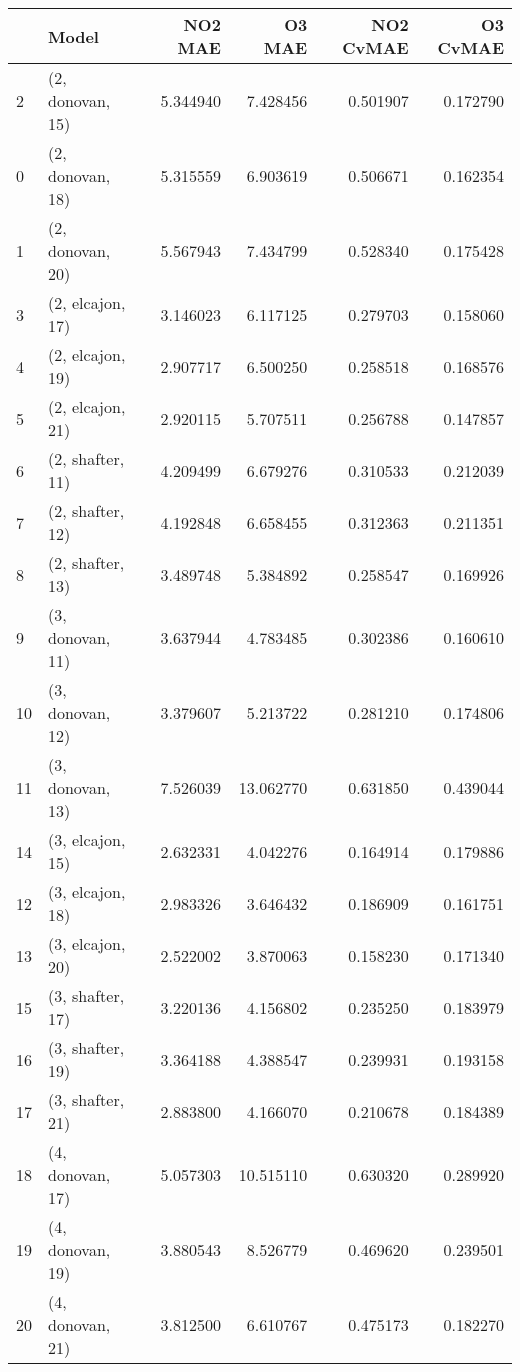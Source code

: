\begin{tabular}{llrrrr}
\toprule
{} &             Model &    NO2 MAE &     O3 MAE &  NO2 CvMAE &  O3 CvMAE \\
\midrule
2  &  (2, donovan, 15) &   5.344940 &   7.428456 &   0.501907 &  0.172790 \\
0  &  (2, donovan, 18) &   5.315559 &   6.903619 &   0.506671 &  0.162354 \\
1  &  (2, donovan, 20) &   5.567943 &   7.434799 &   0.528340 &  0.175428 \\
3  &  (2, elcajon, 17) &   3.146023 &   6.117125 &   0.279703 &  0.158060 \\
4  &  (2, elcajon, 19) &   2.907717 &   6.500250 &   0.258518 &  0.168576 \\
5  &  (2, elcajon, 21) &   2.920115 &   5.707511 &   0.256788 &  0.147857 \\
6  &  (2, shafter, 11) &   4.209499 &   6.679276 &   0.310533 &  0.212039 \\
7  &  (2, shafter, 12) &   4.192848 &   6.658455 &   0.312363 &  0.211351 \\
8  &  (2, shafter, 13) &   3.489748 &   5.384892 &   0.258547 &  0.169926 \\
9  &  (3, donovan, 11) &   3.637944 &   4.783485 &   0.302386 &  0.160610 \\
10 &  (3, donovan, 12) &   3.379607 &   5.213722 &   0.281210 &  0.174806 \\
11 &  (3, donovan, 13) &   7.526039 &  13.062770 &   0.631850 &  0.439044 \\
14 &  (3, elcajon, 15) &   2.632331 &   4.042276 &   0.164914 &  0.179886 \\
12 &  (3, elcajon, 18) &   2.983326 &   3.646432 &   0.186909 &  0.161751 \\
13 &  (3, elcajon, 20) &   2.522002 &   3.870063 &   0.158230 &  0.171340 \\
15 &  (3, shafter, 17) &   3.220136 &   4.156802 &   0.235250 &  0.183979 \\
16 &  (3, shafter, 19) &   3.364188 &   4.388547 &   0.239931 &  0.193158 \\
17 &  (3, shafter, 21) &   2.883800 &   4.166070 &   0.210678 &  0.184389 \\
18 &  (4, donovan, 17) &   5.057303 &  10.515110 &   0.630320 &  0.289920 \\
19 &  (4, donovan, 19) &   3.880543 &   8.526779 &   0.469620 &  0.239501 \\
20 &  (4, donovan, 21) &   3.812500 &   6.610767 &   0.475173 &  0.182270 \\

\end{tabular}
